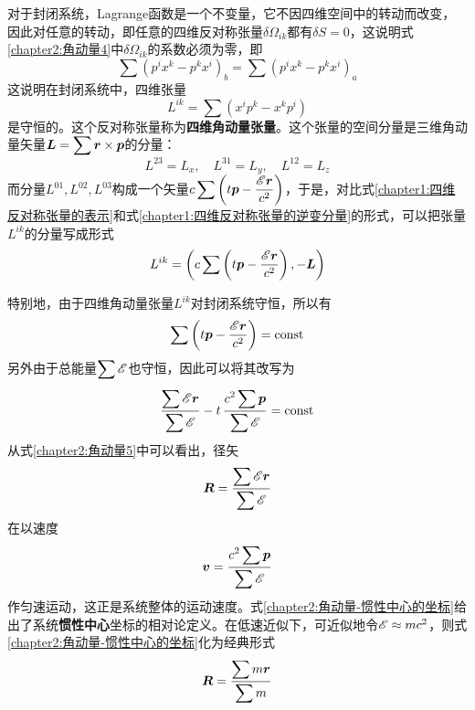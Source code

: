 对于封闭系统，Lagrange函数是一个不变量，它不因四维空间中的转动而改变，因此对任意的转动，即任意的四维反对称张量$\delta\varOmega_{ik}$都有$\delta S=0$，这说明式\eqref{chapter2:角动量4}中$\delta\varOmega_{ik}$的系数必须为零，即
\begin{equation}
	\sum (p^ix^k-p^kx^i)_b = \sum (p^ix^k-p^kx^i)_a
\end{equation}
这说明在封闭系统中，四维张量
\begin{equation}
	L^{ik} = \sum (x^ip^k-x^kp^i)
	\label{chapter2:四维角动量张量的定义}
\end{equation}
是守恒的。这个反对称张量称为{\bf 四维角动量张量}。这个张量的空间分量是三维角动量矢量$\displaystyle \boldsymbol{L} = \sum\boldsymbol{r}\times \boldsymbol{p}$的分量：
\begin{equation*}
	L^{23} = L_x,\quad L^{31} = L_y,\quad L^{12} = L_z
\end{equation*}
而分量$L^{01}, L^{02}, L^{03}$构成一个矢量$\displaystyle c\sum \left(t\boldsymbol{p}-\dfrac{\mathscr{E}\boldsymbol{r}}{c^2}\right)$，于是，对比式\eqref{chapter1:四维反对称张量的表示}和式\eqref{chapter1:四维反对称张量的逆变分量}的形式，可以把张量$L^{ik}$的分量写成形式
\begin{equation}
	L^{ik} = \left(c\sum \left(t\boldsymbol{p}-\dfrac{\mathscr{E}\boldsymbol{r}}{c^2}\right), -\boldsymbol{L}\right)
	\label{chapter2:四维角动量张量的逆变分量表示}
\end{equation}

特别地，由于四维角动量张量$L^{ik}$对封闭系统守恒，所以有
\begin{equation*}
	\sum \left(t\boldsymbol{p}-\frac{\mathscr{E}\boldsymbol{r}}{c^2}\right) = \text{const}
\end{equation*}
另外由于总能量$\displaystyle\sum \mathscr{E}$也守恒，因此可以将其改写为
\begin{equation}
	\frac{\displaystyle \sum\mathscr{E}\boldsymbol{r}}{\displaystyle \sum \mathscr{E}} - t\,\frac{\displaystyle c^2\sum\boldsymbol{p}}{\displaystyle \sum\mathscr{E}} = \text{const}
	\label{chapter2:角动量5}
\end{equation}
从式\eqref{chapter2:角动量5}中可以看出，径矢
\begin{equation}
	\boldsymbol{R} = \frac{\displaystyle\sum \mathscr{E}\boldsymbol{r}}{\displaystyle\sum\mathscr{E}}
	\label{chapter2:角动量-惯性中心的坐标}
\end{equation}
在以速度
\begin{equation}
	\boldsymbol{v} = \frac{\displaystyle c^2\sum\boldsymbol{p}}{\displaystyle\sum\mathscr{E}}
	\label{chapter2:角动量-惯性中心的速度}
\end{equation}
作匀速运动，这正是系统整体的运动速度。式\eqref{chapter2:角动量-惯性中心的坐标}给出了系统{\bf 惯性中心}坐标的相对论定义。在低速近似下，可近似地令$\mathscr{E}\approx mc^2$，则式\eqref{chapter2:角动量-惯性中心的坐标}化为经典形式
\begin{equation*}
	\boldsymbol{R} = \frac{\displaystyle \sum m\boldsymbol{r}}{\displaystyle \sum m}
\end{equation*}

